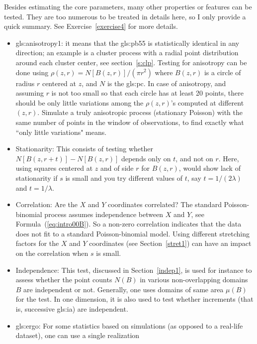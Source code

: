 \documentclass[10pt]{article}
\begin{document}

\noindent Besides estimating the core parameters, many other properties or features can be tested. They are too numerous to be treated in details here, so I only provide a quick
summary. See Exercise~\ref{exercise4} for more details.
\begin{itemize}
\item \Gls{gls:anisotropy1}: it means that the \gls{gls:pb55} is statistically identical in any direction;
an example is a \textcolor{index}{cluster process} with a radial
point distribution around each cluster center, see section~\ref{s:clp}.  Testing for anisotropy can be done using $\rho(z,r)=N[B(z,r)]/(\pi r^2)$ where $B(z,r)$ is a circle of radius $r$ centered at $z$, and $N$ is the \gls{gls:pc}. In case of anisotropy, and assuming $r$ is not too small so that each circle has at least 20 points, there should be only little variations among the $\rho(z,r)$'s computed at different $(z,r)$.  Simulate a truly anisotropic process (stationary Poisson) with the same number of points in the window of observations, to find exactly what ``only little variations" means.
\item \textcolor{index}{Stationarity}: This consists of testing whether $N[B(z,r+t)]-N[B(z,r)]$ depends only on $t$, and not on $r$. Here, using squares
centered at $z$ and of side $r$ for $B(z,r)$, would show lack of stationarity if $s$ is small and you try different values of $t$, say $t=1/(2\lambda)$ and
$t=1/\lambda$.
\item Correlation: Are the $X$ and $Y$ coordinates correlated? The standard Poisson-binomial process assumes independence between $X$ and $Y$, see
Formula~(\ref{eq:intro00B}). So a non-zero correlation indicates that the data does not fit to a standard Poisson-binomial model. Using different stretching factors for the $X$ and $Y$ coordinates (see Section~\ref{stret1}) can have an impact on the correlation when $s$ is small.
\item Independence: This test, discussed in Section~\ref{indep1}, is used for instance to assess whether the point counts $N(B)$ in various non-overlapping domains $B$
are independent or not. Generally, one uses domains of same area $\mu(B)$ for the test. In one dimension, it is also used to test whether \textcolor{index}{increments}
(that is, successive \gls{gls:ia}) are independent.
\item \Gls{gls:ergo}: For some statistics based on simulations (as opposed to a real-life dataset), one can use a single realization

\end{itemize}
\end{document}
